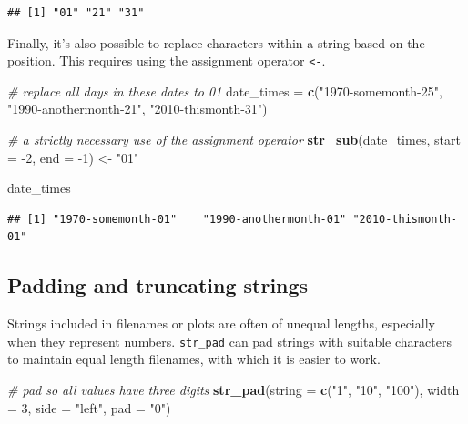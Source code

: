 \documentclass[]{book}
\newenvironment{Shaded}{}{}
\newcommand{\CommentTok}[1]{\textcolor[rgb]{0.38,0.63,0.69}{\textit{#1}}}
\newcommand{\DataTypeTok}[1]{\textcolor[rgb]{0.56,0.13,0.00}{#1}}
\newcommand{\DecValTok}[1]{\textcolor[rgb]{0.25,0.63,0.44}{#1}}
\newcommand{\KeywordTok}[1]{\textcolor[rgb]{0.00,0.44,0.13}{\textbf{#1}}}
\newcommand{\NormalTok}[1]{#1}
\newcommand{\StringTok}[1]{\textcolor[rgb]{0.25,0.44,0.63}{#1}}
\begin{document}
\begin{verbatim}
## [1] "01" "21" "31"
\end{verbatim}

Finally, it's also possible to replace characters within a string based on the position. This requires using the assignment operator \texttt{\textless{}-}.

\begin{Shaded}
\begin{Highlighting}[]
\CommentTok{# replace all days in these dates to 01}
\NormalTok{date_times =}\StringTok{ }\KeywordTok{c}\NormalTok{(}\StringTok{"1970-somemonth-25"}\NormalTok{,}
                     \StringTok{"1990-anothermonth-21"}\NormalTok{,}
                     \StringTok{"2010-thismonth-31"}\NormalTok{)}

\CommentTok{# a strictly necessary use of the assignment operator}
\KeywordTok{str_sub}\NormalTok{(date_times, }
        \DataTypeTok{start =} \DecValTok{-2}\NormalTok{, }\DataTypeTok{end =} \DecValTok{-1}\NormalTok{) <-}\StringTok{ "01"}

\NormalTok{date_times}
\end{Highlighting}
\end{Shaded}

\begin{verbatim}
## [1] "1970-somemonth-01"    "1990-anothermonth-01" "2010-thismonth-01"
\end{verbatim}

\hypertarget{padding-and-truncating-strings}{%
\subsection{Padding and truncating strings}\label{padding-and-truncating-strings}}

Strings included in filenames or plots are often of unequal lengths, especially when they represent numbers. \texttt{str\_pad} can pad strings with suitable characters to maintain equal length filenames, with which it is easier to work.

\begin{Shaded}
\begin{Highlighting}[]
\CommentTok{# pad so all values have three digits}
\KeywordTok{str_pad}\NormalTok{(}\DataTypeTok{string =} \KeywordTok{c}\NormalTok{(}\StringTok{"1"}\NormalTok{, }\StringTok{"10"}\NormalTok{, }\StringTok{"100"}\NormalTok{), }
        \DataTypeTok{width =} \DecValTok{3}\NormalTok{,}
        \DataTypeTok{side =} \StringTok{"left"}\NormalTok{,}
        \DataTypeTok{pad =} \StringTok{"0"}\NormalTok{)}
\end{Highlighting}
\end{Shaded}
\end{document}
